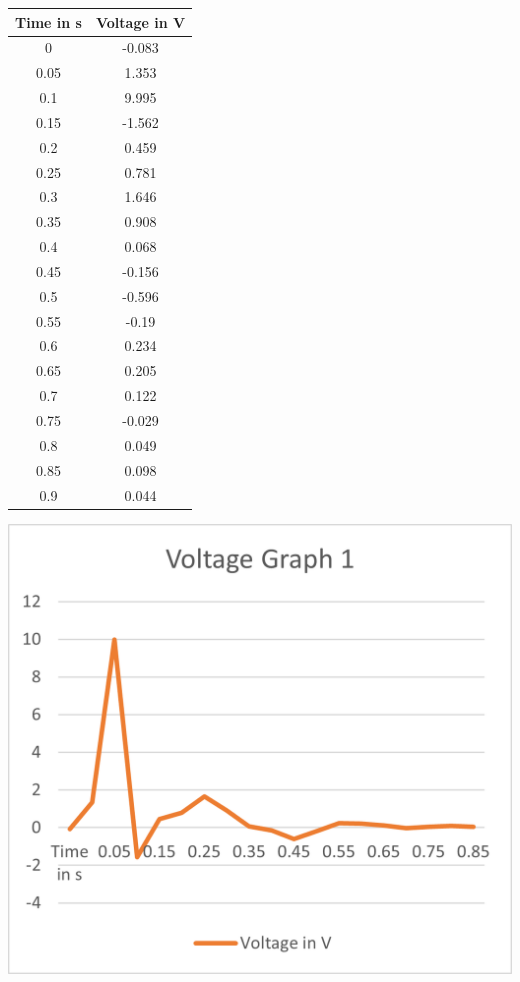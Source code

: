 \begin{minipage}{0.5\textwidth}
    \center
        \begin{tabular}{|c|c|}
        \hline
        Time in s & Voltage in V \\
        \hline
        0 & -0.083 \\
        \hline
        0.05 & 1.353\\
        \hline
        0.1 & 9.995\\
        \hline
        0.15 & -1.562\\
        \hline
        0.2 & 0.459\\
        \hline
        0.25 & 0.781\\
        \hline
        0.3 & 1.646\\
        \hline
        0.35 & 0.908\\
        \hline
        0.4	& 0.068\\
        \hline
        0.45 & -0.156\\
        \hline
        0.5	& -0.596\\
        \hline
        0.55 & -0.19\\
        \hline
        0.6	& 0.234\\
        \hline
        0.65 & 0.205\\
        \hline
        0.7	& 0.122\\
        \hline
        0.75 & -0.029\\
        \hline
        0.8	& 0.049\\
        \hline
        0.85 & 0.098\\
        \hline
        0.9	& 0.044\\
        \hline
        \end{tabular}
        \label{Tab:Values of Voltage Graph 1}
\end{minipage}
\begin{minipage}{0.5\textwidth}
    \includegraphics[width=\textwidth]{./Figure_11.png}
    \label{fig:Voltage Graph 1}
\end{minipage}
